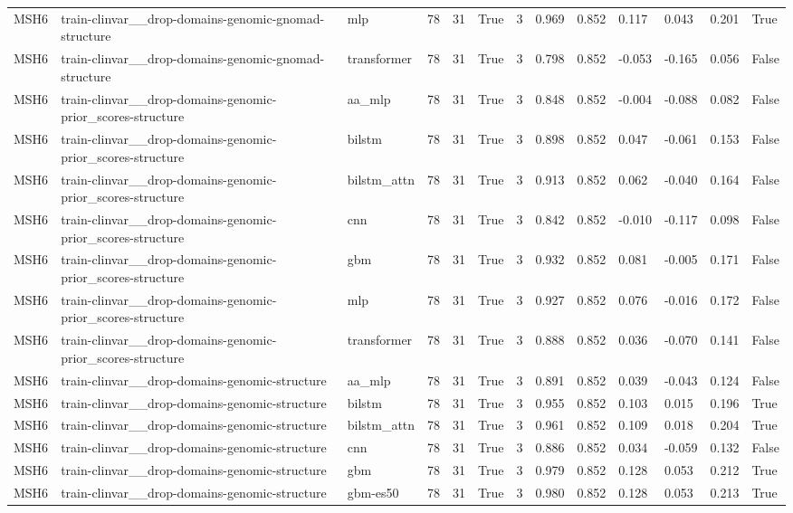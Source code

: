 \begin{table}[t]
\begin{tabular}{lllllllllllll}
MSH6 & train-clinvar\_\_drop-domains-genomic-gnomad-structure & mlp & 78 & 31 & True & 3 & 0.969 & 0.852 & 0.117 & 0.043 & 0.201 & True \\
MSH6 & train-clinvar\_\_drop-domains-genomic-gnomad-structure & transformer & 78 & 31 & True & 3 & 0.798 & 0.852 & -0.053 & -0.165 & 0.056 & False \\
MSH6 & train-clinvar\_\_drop-domains-genomic-prior\_scores-structure & aa\_mlp & 78 & 31 & True & 3 & 0.848 & 0.852 & -0.004 & -0.088 & 0.082 & False \\
MSH6 & train-clinvar\_\_drop-domains-genomic-prior\_scores-structure & bilstm & 78 & 31 & True & 3 & 0.898 & 0.852 & 0.047 & -0.061 & 0.153 & False \\
MSH6 & train-clinvar\_\_drop-domains-genomic-prior\_scores-structure & bilstm\_attn & 78 & 31 & True & 3 & 0.913 & 0.852 & 0.062 & -0.040 & 0.164 & False \\
MSH6 & train-clinvar\_\_drop-domains-genomic-prior\_scores-structure & cnn & 78 & 31 & True & 3 & 0.842 & 0.852 & -0.010 & -0.117 & 0.098 & False \\
MSH6 & train-clinvar\_\_drop-domains-genomic-prior\_scores-structure & gbm & 78 & 31 & True & 3 & 0.932 & 0.852 & 0.081 & -0.005 & 0.171 & False \\
MSH6 & train-clinvar\_\_drop-domains-genomic-prior\_scores-structure & mlp & 78 & 31 & True & 3 & 0.927 & 0.852 & 0.076 & -0.016 & 0.172 & False \\
MSH6 & train-clinvar\_\_drop-domains-genomic-prior\_scores-structure & transformer & 78 & 31 & True & 3 & 0.888 & 0.852 & 0.036 & -0.070 & 0.141 & False \\
MSH6 & train-clinvar\_\_drop-domains-genomic-structure & aa\_mlp & 78 & 31 & True & 3 & 0.891 & 0.852 & 0.039 & -0.043 & 0.124 & False \\
MSH6 & train-clinvar\_\_drop-domains-genomic-structure & bilstm & 78 & 31 & True & 3 & 0.955 & 0.852 & 0.103 & 0.015 & 0.196 & True \\
MSH6 & train-clinvar\_\_drop-domains-genomic-structure & bilstm\_attn & 78 & 31 & True & 3 & 0.961 & 0.852 & 0.109 & 0.018 & 0.204 & True \\
MSH6 & train-clinvar\_\_drop-domains-genomic-structure & cnn & 78 & 31 & True & 3 & 0.886 & 0.852 & 0.034 & -0.059 & 0.132 & False \\
MSH6 & train-clinvar\_\_drop-domains-genomic-structure & gbm & 78 & 31 & True & 3 & 0.979 & 0.852 & 0.128 & 0.053 & 0.212 & True \\
MSH6 & train-clinvar\_\_drop-domains-genomic-structure & gbm-es50 & 78 & 31 & True & 3 & 0.980 & 0.852 & 0.128 & 0.053 & 0.213 & True \\

\end{tabular}
\end{table}
